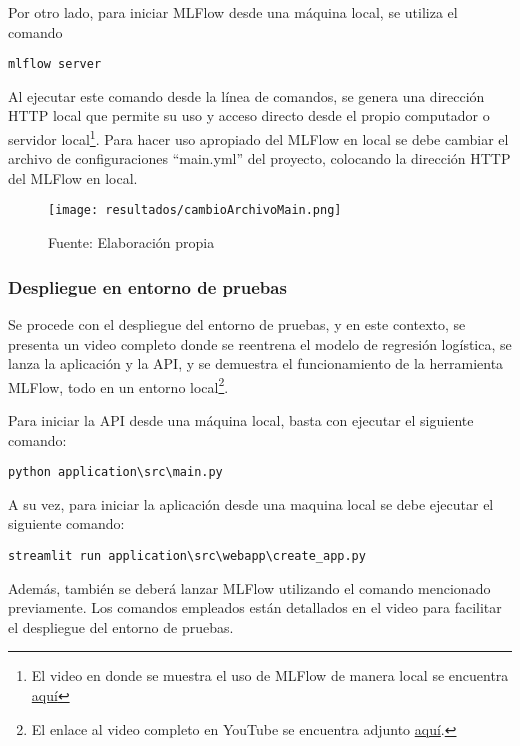 Por otro lado, para iniciar MLFlow desde una máquina local, se utiliza el comando 
\begin{verbatim}
mlflow server
\end{verbatim}

Al ejecutar este comando desde la línea de comandos, se genera una dirección HTTP local que permite su uso y acceso directo desde el propio computador o servidor local\footnote{El video en donde se muestra el uso de MLFlow de manera local se encuentra \href{https://youtu.be/w4WX-OeOkrQ}{aquí}}.
Para hacer uso apropiado del MLFlow en local se debe cambiar el archivo de configuraciones ``main.yml'' del proyecto, colocando la dirección HTTP del MLFlow en local.

\begin{figure}[h]
\centering
\caption{Configuración local del MLFlow en el archivo ``main.yml''}
\texttt{[image: resultados/cambioArchivoMain.png]}
\caption*{\footnotesize Fuente: Elaboración propia}
\label{fig:figuraCambioArchivoMain}
\end{figure}

\subsubsection{Despliegue en entorno de pruebas}

Se procede con el despliegue del entorno de pruebas, y en este contexto, se presenta un video completo donde se reentrena el modelo de regresión logística, se lanza la aplicación y la API, y se demuestra el funcionamiento de la herramienta MLFlow, todo en un entorno local\footnote{El enlace al video completo en YouTube se encuentra adjunto \href{https://youtu.be/1rctGi8Sb7Q}{aquí}.}.

Para iniciar la API desde una máquina local, basta con ejecutar el siguiente comando: \begin{verbatim}python application\src\main.py\end{verbatim}

A su vez, para iniciar la aplicación desde una maquina local se debe ejecutar el siguiente comando: \begin{verbatim}streamlit run application\src\webapp\create_app.py\end{verbatim}

Además, también se deberá lanzar MLFlow utilizando el comando mencionado previamente. Los comandos empleados están detallados en el video para facilitar el despliegue del entorno de pruebas.